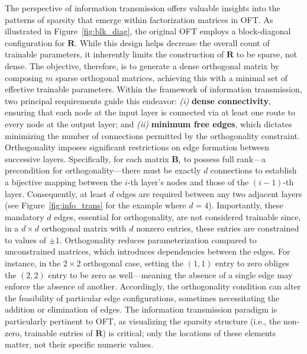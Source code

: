 The perspective of information transmission offers valuable insights into the patterns of sparsity that emerge within factorization matrices in OFT. As illustrated in Figure~\ref{fig:blk_diag}, the original OFT employs a block-diagonal configuration for $\bm{R}$. While this design helps decrease the overall count of trainable parameters, it inherently limits the construction of $\bm{R}$ to be sparse, not dense. The objective, therefore, is to generate a dense orthogonal matrix by composing $m$ sparse orthogonal matrices, achieving this with a minimal set of effective trainable parameters. Within the framework of information transmission, two principal requirements guide this endeavor: \emph{(i)} \textbf{dense connectivity}, ensuring that each node at the input layer is connected via at least one route to every node at the output layer; and \emph{(ii)} \textbf{minimum free edges}, which dictates minimizing the number of connections permitted by the orthogonality constraint. Orthogonality imposes significant restrictions on edge formation between successive layers. Specifically, for each matrix $\bm{B}_i$ to possess full rank—a precondition for orthogonality—there must be exactly $d$ connections to establish a bijective mapping between the $i$-th layer’s nodes and those of the $(i-1)$-th layer. Consequently, at least $d$ edges are required between any two adjacent layers (see Figure~\ref{fig:info_trans} for the example where $d = 4$). Importantly, these mandatory $d$ edges, essential for orthogonality, are not considered trainable since, in a $d \times d$ orthogonal matrix with $d$ nonzero entries, these entries are constrained to values of $\pm 1$. Orthogonality reduces parameterization compared to unconstrained matrices, which introduces dependencies between the edges. For instance, in the $2 \times 2$ orthogonal case, setting the $(1,1)$ entry to zero obliges the $(2,2)$ entry to be zero as well—meaning the absence of a single edge may enforce the absence of another. Accordingly, the orthogonality condition can alter the feasibility of particular edge configurations, sometimes necessitating the addition or elimination of edges. The information transmission paradigm is particularly pertinent to OFT, as visualizing the sparsity structure (i.e., the non-zero, trainable entries of $\bm{R}$) is critical; only the locations of these elements matter, not their specific numeric values.

